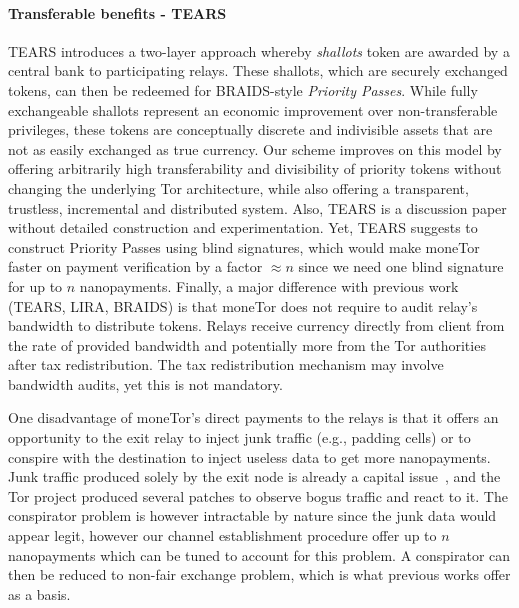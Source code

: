 \paragraph*{Transferable benefits - TEARS} TEARS introduces a two-layer approach whereby \emph{shallots}
token are awarded by a central bank to participating relays. These shallots,
which are securely exchanged tokens, can then be redeemed for BRAIDS-style
\emph{Priority Passes}. While fully exchangeable shallots represent an economic
improvement over non-transferable privileges, these tokens are conceptually
discrete and indivisible assets that are not as easily exchanged as true
currency. Our scheme improves on this model by offering arbitrarily high
transferability and divisibility of priority tokens without changing the
underlying Tor architecture, while also offering a transparent, trustless, incremental and distributed system. Also, TEARS is a discussion paper without detailed construction and experimentation. Yet, TEARS suggests to construct Priority Passes using blind signatures, which would make moneTor faster on payment verification by a factor $\approx n$ since we need one blind signature for up to $n$ nanopayments. Finally, a major difference with previous work (TEARS, LIRA, BRAIDS) is that moneTor does not require to audit relay's bandwidth to distribute tokens. Relays receive currency directly from client from the rate of provided bandwidth and potentially more from the Tor authorities after tax redistribution. The tax redistribution mechanism may involve bandwidth audits, yet this is not mandatory.

One disadvantage of moneTor's direct payments to the relays is that it offers 
an opportunity to the exit relay to inject junk traffic (e.g., 
padding cells) or to conspire with the destination to inject useless 
data to get more nanopayments. Junk traffic produced solely by the 
exit node is already a capital issue~\cite{rochet2018dropping}, and 
the Tor project produced several patches to observe bogus 
traffic and react to it. The conspirator problem is however 
intractable by nature since the junk data would appear legit, 
however our channel establishment procedure offer up to $n$ 
nanopayments which can be tuned to account for this problem. 
A conspirator can then be reduced to 
non-fair exchange problem, which is what previous works offer as a basis.

